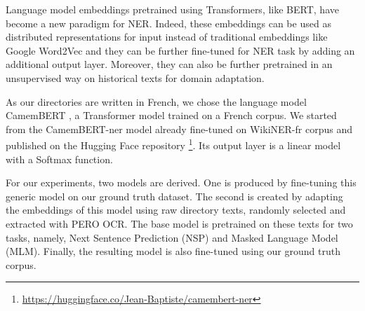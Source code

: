 Language model embeddings pretrained using Transformers, like BERT, have become a new paradigm for NER\cite{li2020}. Indeed, these embeddings can be used as distributed representations for input instead of traditional embeddings like Google Word2Vec and they can be further fine-tuned for NER task by adding an additional output layer. Moreover, they can also be further pretrained in an unsupervised way on historical texts for domain adaptation.

As our directories are written in French, we chose the language model CamemBERT \cite{martin-etal-2020-camembert}, a Transformer model trained on a French corpus. We started from the CamemBERT-ner model already fine-tuned on WikiNER-fr corpus and published on the Hugging Face repository \footnote{\url{https://huggingface.co/Jean-Baptiste/camembert-ner}}. Its output layer is a linear model with a Softmax function.

For our experiments, two models are derived. One is produced by fine-tuning this generic model on our ground truth dataset.
The second is created by adapting the embeddings of this model using raw directory texts, randomly selected and extracted with PERO OCR. The base model is pretrained on these texts for two tasks, namely, Next Sentence Prediction (NSP) and Masked Language Model (MLM). Finally, the resulting model is also fine-tuned using our ground truth corpus.


